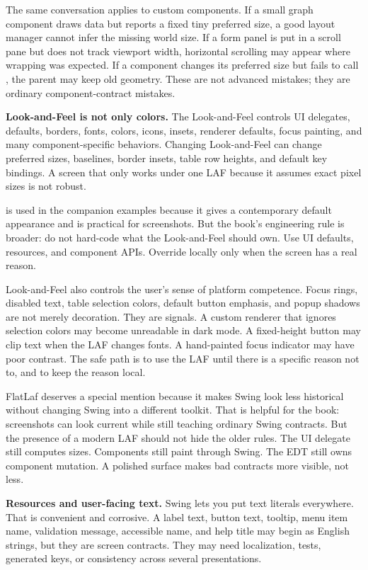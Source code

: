 The same conversation applies to custom components. If a small graph component draws data but reports a fixed tiny preferred size, a good layout manager cannot infer the missing world size. If a form panel is put in a scroll pane but does not track viewport width, horizontal scrolling may appear where wrapping was expected. If a component changes its preferred size but fails to call , the parent may keep old geometry. These are not advanced mistakes; they are ordinary component-contract mistakes.

\textbf{Look-and-Feel is not only colors.} The Look-and-Feel controls UI delegates, defaults, borders, fonts, colors, icons, insets, renderer defaults, focus painting, and many component-specific behaviors. Changing Look-and-Feel can change preferred sizes, baselines, border insets, table row heights, and default key bindings. A screen that only works under one LAF because it assumes exact pixel sizes is not robust.

\flatlaf{} is used in the companion examples because it gives a contemporary default appearance and is practical for screenshots. But the book's engineering rule is broader: do not hard-code what the Look-and-Feel should own. Use UI defaults, resources, and component APIs. Override locally only when the screen has a real reason.

Look-and-Feel also controls the user's sense of platform competence. Focus rings, disabled text, table selection colors, default button emphasis, and popup shadows are not merely decoration. They are signals. A custom renderer that ignores selection colors may become unreadable in dark mode. A fixed-height button may clip text when the LAF changes fonts. A hand-painted focus indicator may have poor contrast. The safe path is to use the LAF until there is a specific reason not to, and to keep the reason local.

FlatLaf deserves a special mention because it makes Swing look less historical without changing Swing into a different toolkit. That is helpful for the book: screenshots can look current while still teaching ordinary Swing contracts. But the presence of a modern LAF should not hide the older rules. The UI delegate still computes sizes. Components still paint through Swing. The EDT still owns component mutation. A polished surface makes bad contracts more visible, not less.

\textbf{Resources and user-facing text.} Swing lets you put text literals everywhere. That is convenient and corrosive. A label text, button text, tooltip, menu item name, validation message, accessible name, and help title may begin as English strings, but they are screen contracts. They may need localization, tests, generated keys, or consistency across several presentations.

